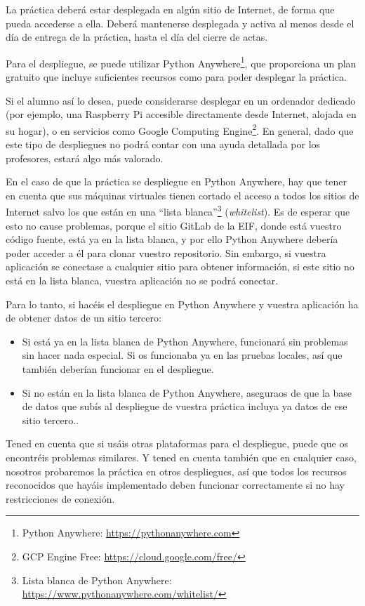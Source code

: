 La práctica deberá estar desplegada en algún sitio de Internet, de forma que pueda accederse a ella. Deberá mantenerse desplegada y activa al menos desde el día de entrega de la práctica, hasta el día del cierre de actas.

Para el despliegue, se puede utilizar Python Anywhere\footnote{Python Anywhere: \url{https://pythonanywhere.com}}, que proporciona un plan gratuito que incluye suficientes recursos como para poder desplegar la práctica.

Si el alumno así lo desea, puede considerarse desplegar en un ordenador dedicado (por ejemplo, una Raspberry Pi accesible directamente desde Internet, alojada en su hogar), o en servicios como Google Computing Engine\footnote{GCP Engine Free: \url{https://cloud.google.com/free/}}. En general, dado que este tipo de despliegues no podrá contar con una ayuda detallada por los profesores, estará algo más valorado.

En el caso de que la práctica se despliegue en Python Anywhere, hay que tener en cuenta que sus máquinas virtuales tienen cortado el acceso a todos los sitios de Internet salvo los que están en una ``lista blanca''\footnote{Lista blanca de Python Anywhere: \url{https://www.pythonanywhere.com/whitelist/}} (\emph{whitelist}). Es de esperar que esto no cause problemas, porque el sitio GitLab de la EIF, donde está vuestro código fuente, está ya en la lista blanca, y por ello Python Anywhere debería poder acceder a él para clonar vuestro repositorio. Sin embargo, si vuestra aplicación se conectase a cualquier sitio para obtener información, si este sitio no está en la lista blanca, vuestra aplicación no se podrá conectar.

Para lo tanto, si hacéis el despliegue en Python Anywhere y vuestra aplicación ha de obtener datos de un sitio tercero:

\begin{itemize}
  \item Si está ya en la lista blanca de Python Anywhere, funcionará sin problemas sin hacer nada especial. Si os funcionaba ya en las pruebas locales, así que también deberían funcionar en el despliegue.
  \item Si no están en la lista blanca de Python Anywhere, aseguraos de que la base de datos que subís al despliegue de vuestra práctica incluya ya datos de ese sitio tercero..
\end{itemize}

Tened en cuenta que si usáis otras plataformas para el despliegue, puede que os encontréis problemas similares. Y tened en cuenta también que en cualquier caso, nosotros probaremos la práctica en otros despliegues, así que todos los recursos reconocidos que hayáis implementado deben funcionar correctamente si no hay restricciones de conexión.

